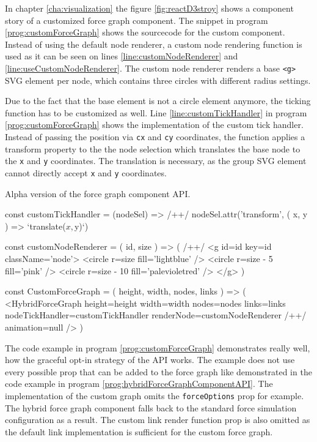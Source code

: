 In chapter \ref{cha:visualization} the figure \ref{fig:reactD3stroy} shows a component story of a customized force graph component. The snippet in program \ref{prog:customForceGraph} shows the sourcecode for the custom component. Instead of using the default node renderer, a custom node rendering function is used as it can be seen on lines \ref{line:customNodeRenderer} and \ref{line:useCustomNodeRenderer}. The custom node renderer renders a base \texttt{<g>} SVG element per node, which contains three circles with different radius settings. 

Due to the fact that the base element is not a circle element anymore, the ticking function has to be customized as well. Line \ref{line:customTickHandler} in program \ref{prog:customForceGraph} shows the implementation of the custom tick handler. Instead of passing the position via \texttt{cx} and \texttt{cy} coordinates, the function applies a transform property to the the node selection which translates the base node to the \texttt{x} and \texttt{y} coordinates. The translation is necessary, as the group SVG element cannot directly accept \texttt{x} and \texttt{y} coordinates.

\begin{program}
\caption{Alpha version of the force graph component API.}
\label{prog:customForceGraph}
\begin{JsCode}
const customTickHandler = (nodeSel) => /+\label{line:customTickHandler}+/ 
  nodeSel.attr('transform', ({ x, y }) => `translate(${x},${y})`)

const customNodeRenderer = ({ id, size }) => ( /+\label{line:customNodeRenderer}+/ 
  <g id={id} key={id} className={'node'}>
    <circle r={size} fill={'lightblue'} />
    <circle r={size - 5} fill={'pink'} />
    <circle r={size - 10} fill={'palevioletred'} />
  </g>
)

const CustomForceGraph = ({ height, width, nodes, links }) => (
  <HybridForceGraph
    height={height}
    width={width}
    nodes={nodes}
    links={links}
    nodeTickHandler={customTickHandler}
    renderNode={customNodeRenderer} /+\label{line:useCustomNodeRenderer}+/ 
    animation={null}
  />
)
\end{JsCode}
\end{program}

The code example in program \ref{prog:customForceGraph} demonstrates really well, how the graceful opt-in strategy of the API works. The example does not use every possible prop that can be added to the force graph like demonstrated in the code example in program \ref{prog:hybridForceGraphComponentAPI}. The implementation of the custom graph omits the \texttt{forceOptions} prop for example. The hybrid force graph component falls back to the standard force simulation configuration as a result. The custom link render function prop is also omitted as the default link implementation is sufficient for the custom force graph.

